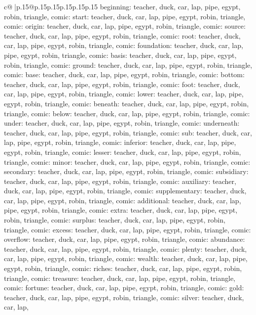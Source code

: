 \documentclass{article}
\begin{document}
{\begin{supertabular}{c@{$\;$}|p{.15\linewidth}@{}p{.15\linewidth}p{.15\linewidth}p{.15\linewidth}p{.15\linewidth}p{.15\linewidth}}
{{{beginning\nTARGETS: teacher, duck, car, lap, pipe, egypt, robin, triangle, comic\n\nCLUE: start\nTARGETS: teacher, duck, car, lap, pipe, egypt, robin, triangle, comic\n\nCLUE: origin\nTARGETS: teacher, duck, car, lap, pipe, egypt, robin, triangle, comic\n\nCLUE: source\nTARGETS: teacher, duck, car, lap, pipe, egypt, robin, triangle, comic\n\nCLUE: root\nTARGETS: teacher, duck, car, lap, pipe, egypt, robin, triangle, comic\n\nCLUE: foundation\nTARGETS: teacher, duck, car, lap, pipe, egypt, robin, triangle, comic\n\nCLUE: basis\nTARGETS: teacher, duck, car, lap, pipe, egypt, robin, triangle, comic\n\nCLUE: ground\nTARGETS: teacher, duck, car, lap, pipe, egypt, robin, triangle, comic\n\nCLUE: base\nTARGETS: teacher, duck, car, lap, pipe, egypt, robin, triangle, comic\n\nCLUE: bottom\nTARGETS: teacher, duck, car, lap, pipe, egypt, robin, triangle, comic\n\nCLUE: foot\nTARGETS: teacher, duck, car, lap, pipe, egypt, robin, triangle, comic\n\nCLUE: lower\nTARGETS: teacher, duck, car, lap, pipe, egypt, robin, triangle, comic\n\nCLUE: beneath\nTARGETS: teacher, duck, car, lap, pipe, egypt, robin, triangle, comic\n\nCLUE: below\nTARGETS: teacher, duck, car, lap, pipe, egypt, robin, triangle, comic\n\nCLUE: under\nTARGETS: teacher, duck, car, lap, pipe, egypt, robin, triangle, comic\n\nCLUE: underneath\nTARGETS: teacher, duck, car, lap, pipe, egypt, robin, triangle, comic\n\nCLUE: sub\nTARGETS: teacher, duck, car, lap, pipe, egypt, robin, triangle, comic\n\nCLUE: inferior\nTARGETS: teacher, duck, car, lap, pipe, egypt, robin, triangle, comic\n\nCLUE: lesser\nTARGETS: teacher, duck, car, lap, pipe, egypt, robin, triangle, comic\n\nCLUE: minor\nTARGETS: teacher, duck, car, lap, pipe, egypt, robin, triangle, comic\n\nCLUE: secondary\nTARGETS: teacher, duck, car, lap, pipe, egypt, robin, triangle, comic\n\nCLUE: subsidiary\nTARGETS: teacher, duck, car, lap, pipe, egypt, robin, triangle, comic\n\nCLUE: auxiliary\nTARGETS: teacher, duck, car, lap, pipe, egypt, robin, triangle, comic\n\nCLUE: supplementary\nTARGETS: teacher, duck, car, lap, pipe, egypt, robin, triangle, comic\n\nCLUE: additional\nTARGETS: teacher, duck, car, lap, pipe, egypt, robin, triangle, comic\n\nCLUE: extra\nTARGETS: teacher, duck, car, lap, pipe, egypt, robin, triangle, comic\n\nCLUE: surplus\nTARGETS: teacher, duck, car, lap, pipe, egypt, robin, triangle, comic\n\nCLUE: excess\nTARGETS: teacher, duck, car, lap, pipe, egypt, robin, triangle, comic\n\nCLUE: overflow\nTARGETS: teacher, duck, car, lap, pipe, egypt, robin, triangle, comic\n\nCLUE: abundance\nTARGETS: teacher, duck, car, lap, pipe, egypt, robin, triangle, comic\n\nCLUE: plenty\nTARGETS: teacher, duck, car, lap, pipe, egypt, robin, triangle, comic\n\nCLUE: wealth\nTARGETS: teacher, duck, car, lap, pipe, egypt, robin, triangle, comic\n\nCLUE: riches\nTARGETS: teacher, duck, car, lap, pipe, egypt, robin, triangle, comic\n\nCLUE: treasure\nTARGETS: teacher, duck, car, lap, pipe, egypt, robin, triangle, comic\n\nCLUE: fortune\nTARGETS: teacher, duck, car, lap, pipe, egypt, robin, triangle, comic\n\nCLUE: gold\nTARGETS: teacher, duck, car, lap, pipe, egypt, robin, triangle, comic\n\nCLUE: silver\nTARGETS: teacher, duck, car, lap, }}}
\end{supertabular}}
\end{document}
